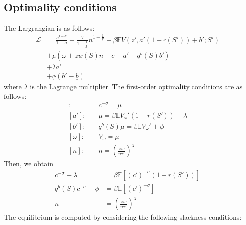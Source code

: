 \subsection*{Optimality conditions}
The Largrangian is as follows:
\begin{align*}
  \mathcal{L} &= \frac{c^{1-\sigma}}{1-\sigma} -\frac{\eta}{1+\frac{1}{\chi}} n^{1+\frac{1}{\chi}} + \beta \mathbb{E}V(z',a'(1+r(S')) + b';S')
  \\ 
  &+ \mu\left(\omega +zw(S)n - c - a' - q^{b}(S)b' \right)
  \\
  &+ \lambda a'
  \\
  &+ \phi (b'-\underline{b})
\end{align*}
where $\lambda$ is the Lagrange multiplier.
The first-order optimality conditions are as follows:
\begin{align*}
  [c]:&\quad c^{-\sigma} = \mu
  \\
  [a']:&\quad \mu = \beta \mathbb{E}V_{\omega}'(1+r(S')) + \lambda
  \\
  [b']:&\quad q^{b}(S)\mu = \beta \mathbb{E}V_{\omega}' + \phi
  \\
  [\omega]:&\quad V_{\omega} = \mu
  \\
  [n]:&\quad n = \left(\frac{zw}{\eta c^{\sigma}}\right)^{\chi}
\end{align*}
Then, we obtain
\begin{align*}
  c^{-\sigma}- \lambda &= \beta \mathbb{E}\left[(c')^{-\sigma}(1+r(S'))\right] 
  \\
  q^{b}(S)c^{-\sigma}-\phi &= \beta \mathbb{E}\left[(c')^{-\sigma}\right]
  \\
  n &= \left(\frac{zw}{\eta c^{\sigma}}\right)^{\chi}
\end{align*}
The equilibrium is computed by considering the following slackness conditions:
